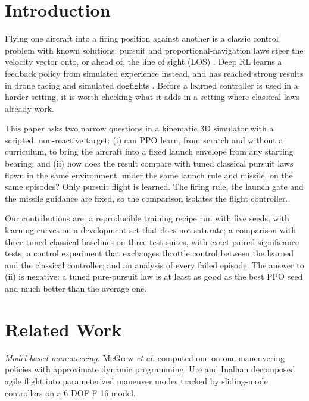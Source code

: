 \documentclass[conference]{IEEEtran}
\begin{document}
\section{Introduction}
Flying one aircraft into a firing position against another is a classic control problem with known solutions: pursuit and proportional-navigation laws steer the velocity vector onto, or ahead of, the line of sight (LOS) \cite{shneydor1998pursuit,zarchan2012guidance}. Deep RL learns a feedback policy from simulated experience instead, and has reached strong results in drone racing \cite{kaufmann2023racing} and simulated dogfights \cite{pope2021hierarchical,pope2023adt,li2022msddqn}. Before a learned controller is used in a harder setting, it is worth checking what it adds in a setting where classical laws already work.

This paper asks two narrow questions in a kinematic 3D simulator with a scripted, non-reactive target: (i) can PPO \cite{schulman2017ppo} learn, from scratch and without a curriculum, to bring the aircraft into a fixed launch envelope from any starting bearing; and (ii) how does the result compare with tuned classical pursuit laws flown in the same environment, under the same launch rule and missile, on the same episodes? Only pursuit flight is learned. The firing rule, the launch gate and the missile guidance are fixed, so the comparison isolates the flight controller.

Our contributions are: a reproducible training recipe run with five seeds, with learning curves on a development set that does not saturate; a comparison with three tuned classical baselines on three test suites, with exact paired significance tests; a control experiment that exchanges throttle control between the learned and the classical controller; and an analysis of every failed episode. The answer to (ii) is negative: a tuned pure-pursuit law is at least as good as the best PPO seed and much better than the average one.

\section{Related Work}\label{sec:related}
\emph{Model-based maneuvering.} McGrew \emph{et al.} \cite{mcgrew2010adp} computed one-on-one maneuvering policies with approximate dynamic programming. Ure and Inalhan \cite{ure2012ucav} decomposed agile flight into parameterized maneuver modes tracked by sliding-mode controllers on a 6-DOF F-16 model.
\end{document}
